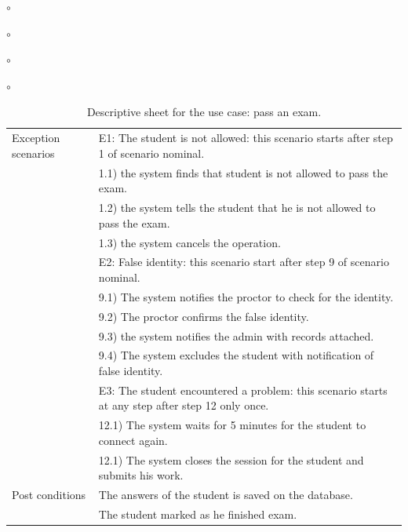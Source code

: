\documentclass[]{uc2pfecaneva}
\begin{document}
\begin{list}{$\circ$}{}
\begin{list}{$\circ$}{}
\begin{list}{$\circ$}{}
\begin{list}{$\circ$}{}
\begin{table}[h]
        \label{table:4}
    \end{table}
    \clearpage
    \begin{table}
        \centering
        \begin{tabularx}{\textwidth}{|l|X|}
            \hline
            Exception scenarios
            & E1: The student is not allowed: this scenario starts after step 1 of scenario nominal.            \\
            & \hspace{4mm}1.1) the system finds that student is not allowed to pass the exam.                   \\
            & \hspace{4mm}1.2) the system tells the student that he is not allowed to pass the exam.            \\
            & \hspace{4mm}1.3) the system cancels the operation.                                                \\
            & E2: False identity: this scenario start after step 9 of scenario nominal.                         \\
            & \hspace{4mm}9.1) The system notifies the proctor to check for the identity.                       \\
            & \hspace{4mm}9.2) The proctor confirms the false identity.                                         \\
            & \hspace{4mm}9.3) the system notifies the admin with records attached.                             \\
            & \hspace{4mm}9.4) The system excludes the student with notification of false identity.             \\
            & E3: The student encountered a problem: this scenario starts at any step after step 12 only once.  \\
            & \hspace{4mm}12.1) The system waits for 5 minutes for the student to connect again.                \\
            & \hspace{4mm}12.1) The system closes the session for the student and submits his work.             \\ \hline
            Post conditions
            & The answers of the student is saved on the database.                                              \\
            & The student marked as he finished exam.                                                           \\ \hline
        \end{tabularx}
        \caption{Descriptive sheet for the use case: pass an exam.}
    \end{table}



\end{list}
\end{list}
\end{list}
\end{list}
\end{document}
